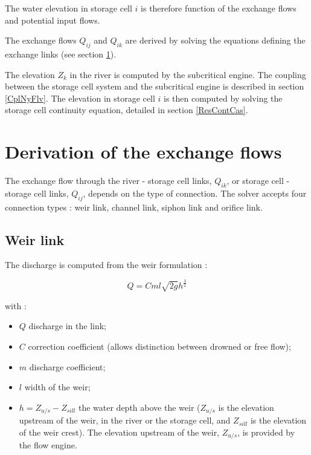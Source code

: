 The water elevation in storage cell $i$ is therefore function of the exchange flows and potential input flows.

The exchange flows $Q_{ij}$ and $Q_{ik}$ are derived by solving the equations defining the exchange links (see section \ref{DebEch}).

The elevation $Z_k$ in the river is computed by the subcritical engine. The coupling between the storage cell system and the subcritical engine is described in section \ref{CplNyFlv}. The elevation in storage cell $i$ is then computed by solving the storage cell continuity equation, detailed in section \ref{ResContCas}.

\section{Derivation of the exchange flows}
\label{DebEch}

The exchange flow through the river - storage cell links, $Q_{ik}$, or storage cell - storage cell links, $Q_{ij}$, depends on the type of connection. The solver accepts four connection types : weir link, channel link, siphon link and orifice link.

\subsection{Weir link}

The discharge is computed from the weir formulation :

\begin{equation}
 Q = C m l \sqrt{2 g} h^{\frac{3}{2}}
\end{equation}

with :
\begin{itemize}
 \item $Q$ discharge in the link;
 \item $C$ correction coefficient (allows distinction between drowned or free flow);
 \item $m$ discharge coefficient;
 \item $l$ width of the weir;
 \item $h = Z_{u/s} - Z_{sill}$ the water depth above the weir ($Z_{u/s}$ is the elevation upstream of the weir, in the river or the storage cell, and $Z_{sill}$ is the elevation of the weir crest). The elevation upstream of the weir, $Z_{u/s}$, is provided by the flow engine.
\end{itemize}

